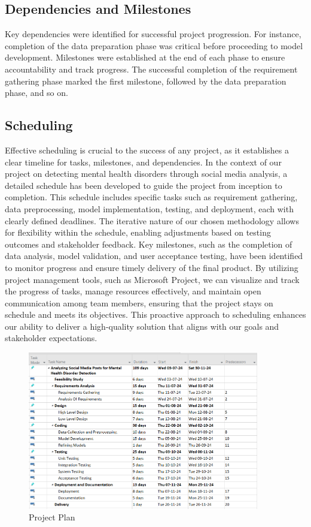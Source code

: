 \subsection{Dependencies and Milestones} 
\noindent
Key dependencies were identified for successful project progression. For instance, completion of the data preparation phase was critical before proceeding to model development. Milestones were established at the end of each phase to ensure accountability and track progress. The successful completion of the requirement gathering phase marked the first milestone, followed by the data preparation phase, and so on.

\subsection{Scheduling}
\noindent
Effective scheduling is crucial to the success of any project, as it establishes a clear timeline for tasks, milestones, and dependencies. In the context of our project on detecting mental health disorders through social media analysis, a detailed schedule has been developed to guide the project from inception to completion. This schedule includes specific tasks such as requirement gathering, data preprocessing, model implementation, testing, and deployment, each with clearly defined deadlines. The iterative nature of our chosen methodology allows for flexibility within the schedule, enabling adjustments based on testing outcomes and stakeholder feedback. Key milestones, such as the completion of data analysis, model validation, and user acceptance testing, have been identified to monitor progress and ensure timely delivery of the final product. By utilizing project management tools, such as Microsoft Project, we can visualize and track the progress of tasks, manage resources effectively, and maintain open communication among team members, ensuring that the project stays on schedule and meets its objectives. This proactive approach to scheduling enhances our ability to deliver a high-quality solution that aligns with our goals and stakeholder expectations.

\begin{figure}[h!]  
    \centering
    \includegraphics[width=0.9\textwidth]{Images/MS Project Plan Sem 7.png}  
    \caption{Project Plan}
    \label{Project Plan}  %
\end{figure}

